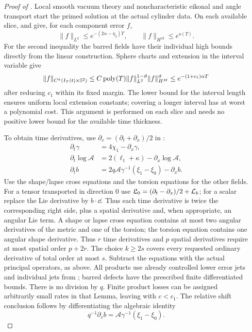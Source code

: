 \begin{proof}[Proof of ]
Local smooth vacuum theory and noncharacteristic eikonal and
angle transport start the primed solution at the actual cylinder
data.  On each available slice,  and
 give, for each component error $f$,
\[
 \|f\|_{L^2}\le e^{-(2\alpha-\eta_2)T},
                       \qquad\|f\|_{H^M}\le e^{o(T)}.
\]
For the second inequality the barred fields have their individual
high bounds directly from the linear construction.  Sphere charts
and extension in the interval variable give
\begin{equation}\label{dn:spatial-interpolation}
 \|f\|_{C^k(I_T(t)\times\mathbb S^2)}
 \le C\operatorname{poly}(T)
      \|f\|_{L^2}^{1-\vartheta}\|f\|_{H^M}^{\vartheta}
                    \le e^{-(1+c_1)\alpha T}
\end{equation}
after reducing $c_1$ within its fixed margin.  The lower bound for
the interval length ensures uniform local extension constants;
covering a longer interval has at worst a polynomial cost.
This argument is performed on each slice and needs no positive
lower bound for the available time thickness.

To obtain time derivatives, use $\partial_v=(\partial_t+
\partial_x)/2$ in :
\[
\begin{aligned}
 \partial_t\gamma&=4\chi_1-\partial_x\gamma,\\
 \partial_t\log\mathcal A
   &=2(\ell_1+\kappa)-\partial_x\log\mathcal A,\\
 \partial_tb
   &=2q\mathcal A\gamma^{-1}(\xi_1-\xi_0)-\partial_xb .
\end{aligned}
\]
Use the shape/lapse cross equations and the torsion equations for the
other fields.  For a tensor
transported in direction $0$ use
$\mathfrak L_0=(\partial_t-\partial_x)/2+\mathcal L_b$; for a scalar
replace the Lie derivative by $b\cdot\dd$.  Thus each time
derivative is twice the corresponding right side, plus a spatial
derivative and, when appropriate, an angular Lie term.  A shape
or lapse cross equation contains at most two angular derivatives
of the metric and one of the torsion; the torsion equation contains
one angular shape derivative.  Thus $r$ time derivatives and $p$
spatial derivatives require at most spatial order $p+2r$.  The choice
$k\ge2s$ covers every requested ordinary derivative of total order
at most $s$.  Subtract the
equations with the actual principal operators, as above.  All
products use already controlled lower error jets and individual
jets from ; barred defects have the
prescribed finite differentiated bounds.  There is no division by
$q$.  Finite product losses can be assigned arbitrarily small
rates in that Lemma, leaving  with $c<c_1$.
The relative shift conclusion follows by differentiating the
algebraic identity
\[
 q^{-1}\partial_vb=\mathcal A\gamma^{-1}(\xi_1-\xi_0).
\]


\end{proof}
